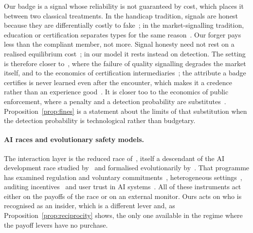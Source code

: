 \documentclass[11pt,a4paper]{article}
\theoremstyle{definition}
\begin{document}
Our badge is a signal whose reliability is not guaranteed by cost, which places
it between two classical treatments. In the handicap tradition, signals are
honest because they are differentially costly to
fake~\citep{zahavi1975mate,grafen1990biological}; in the market-signalling
tradition, education or certification separates types for the same
reason~\citep{spence1973job}. Our forger pays less than the compliant member,
not more. Signal honesty need not rest on a realised equilibrium
cost~\citep{szamado2011cost}; in our model it rests instead on detection.
The setting is therefore closer to~\citet{akerlof1970market}, where the failure
of quality signalling degrades the market itself, and to the economics of
certification intermediaries~\citep{lizzeri1999information,dranove2010quality};
the attribute a badge certifies is never learned even after the encounter, which
makes it a credence rather than an experience
good~\citep{darby1973free,dulleck2006doctors}. It is closer too to the economics of
public enforcement, where a penalty and a detection probability are
substitutes~\citep{becker1968crime}. Proposition~\ref{prop:fines} is a
statement about the limits of that substitution when the detection probability
is technological rather than budgetary.

\paragraph{AI races and evolutionary safety models.}
The interaction layer is the reduced race
of~\citet{domingos2026falling}, itself a descendant of the AI development race
studied by~\citet{armstrong2016racing} and formalised evolutionarily
by~\citet{han2020regulate}. That programme has examined regulation and
voluntary commitments~\citep{han2022voluntary}, heterogeneous
settings~\citep{cimpeanu2022heterogeneous}, auditing
incentives~\citep{bova2024vigilant} and user trust
in AI systems~\citep{bashir2026trust}. All of these instruments act either on
the payoffs of the race or on an external monitor. Ours acts on who is
recognised as an insider, which is a different lever and, as
Proposition~\ref{prop:reciprocity} shows, the only one available in the regime
where the payoff levers have no purchase.
\end{document}
